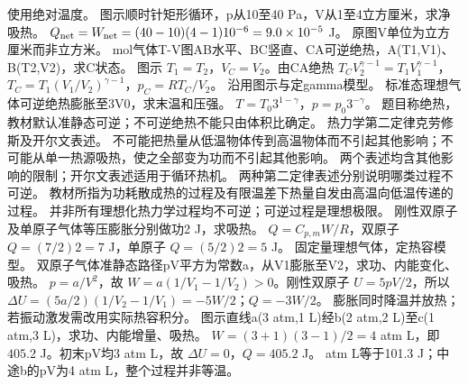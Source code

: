 \crosscheck 使用绝对温度。
\problemtext 图示顺时针矩形循环，p从10至40 Pa，V从1至4立方厘米，求净吸热。
\workings $Q_{\rm net}=W_{\rm net}=(40-10)(4-1)10^{-6}=9.0\times10^{-5}$ J。
\crosscheck 原图V单位为立方厘米而非立方米。
 mol气体T-V图AB水平、BC竖直、CA可逆绝热，A(T1,V1)、B(T2,V2)，求C状态。
\workings 图示 $T_1=T_2$，$V_C=V_2$。由CA绝热 $T_CV_2^{\gamma-1}=T_1V_1^{\gamma-1}$，$T_C=T_1(V_1/V_2)^{\gamma-1}$，$p_C=RT_C/V_2$。
\crosscheck 沿用图示与定gamma模型。
\problemtext 标准态理想气体可逆绝热膨胀至3V0，求末温和压强。
\workings $T=T_0 3^{1-\gamma}$，$p=p_0 3^{-\gamma}$。
\crosscheck 题目称绝热，教材默认准静态可逆；不可逆绝热不能只由体积比确定。
\problemtext 热力学第二定律克劳修斯及开尔文表述。
\workings 不可能把热量从低温物体传到高温物体而不引起其他影响；不可能从单一热源吸热，使之全部变为功而不引起其他影响。
\crosscheck 两个表述均含其他影响的限制；开尔文表述适用于循环热机。
\problemtext 两种第二定律表述分别说明哪类过程不可逆。
\workings 教材所指为功耗散成热的过程及有限温差下热量自发由高温向低温传递的过程。
\crosscheck 并非所有理想化热力学过程均不可逆；可逆过程是理想极限。
\problemtext 刚性双原子及单原子气体等压膨胀分别做功2 J，求吸热。
\workings $Q=C_{p,m}W/R$，双原子 $Q=(7/2)2=7$ J，单原子 $Q=(5/2)2=5$ J。
\crosscheck 固定量理想气体，定热容模型。
\problemtext 双原子气体准静态路径pV平方为常数a，从V1膨胀至V2，求功、内能变化、吸热。
\workings $p=a/V^2$，故 $W=a(1/V_1-1/V_2)>0$。刚性双原子 $U=5pV/2$，所以 $\Delta U=(5a/2)(1/V_2-1/V_1)=-5W/2$；$Q=-3W/2$。
\crosscheck 膨胀同时降温并放热；若振动激发需改用实际热容积分。
\problemtext 图示直线a(3 atm,1 L)经b(2 atm,2 L)至c(1 atm,3 L)，求功、内能增量、吸热。
\workings $W=(3+1)(3-1)/2=4$ atm L，即 $405.2$ J。初末pV均3 atm L，故 $\Delta U=0$，$Q=405.2$ J。
 atm L等于101.3 J；中途b的pV为4 atm L，整个过程并非等温。

